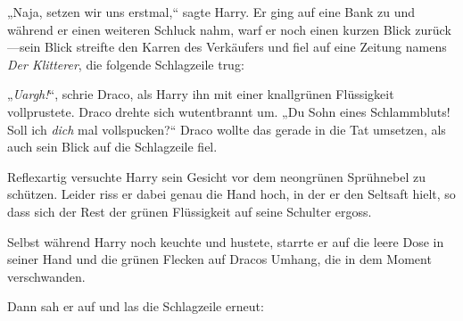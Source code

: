 „Naja, setzen wir uns erstmal,“ sagte Harry. Er ging auf eine Bank zu und während er einen weiteren Schluck nahm, warf er noch einen kurzen Blick zurück—sein Blick streifte den Karren des Verkäufers und fiel auf eine Zeitung namens \emph{Der Klitterer}, die folgende Schlagzeile trug:


„\emph{Uargh!}“, schrie Draco, als Harry ihn mit einer knallgrünen Flüssigkeit vollprustete. Draco drehte sich wutentbrannt um. „Du Sohn eines Schlammbluts! Soll ich \emph{dich} mal vollspucken?“ Draco wollte das gerade in die Tat umsetzen, als auch sein Blick auf die Schlagzeile fiel.

Reflexartig versuchte Harry sein Gesicht vor dem neongrünen Sprühnebel zu schützen. Leider riss er dabei genau die Hand hoch, in der er den Seltsaft hielt, so dass sich der Rest der grünen Flüssigkeit auf seine Schulter ergoss.

Selbst während Harry noch keuchte und hustete, starrte er auf die leere Dose in seiner Hand und die grünen Flecken auf Dracos Umhang, die in dem Moment verschwanden.

Dann sah er auf und las die Schlagzeile erneut:


